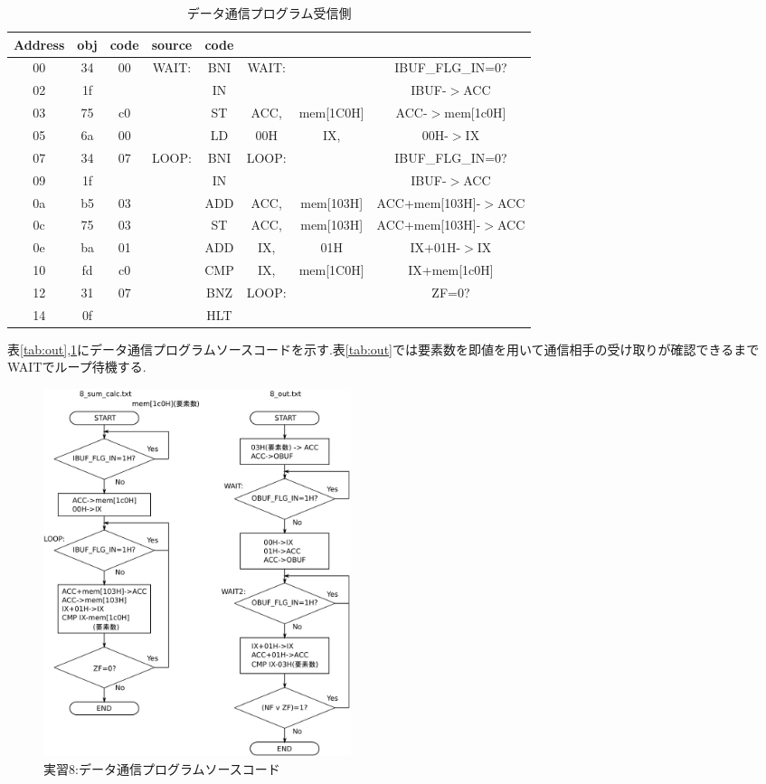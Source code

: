 \documentclass[dvipdfmx]{jsarticle}
\begin{document}
      \begin{table}[h]
        \centering
        \caption{データ通信プログラム受信側}
        \label{tab:in}
        \begin{tabular}{c|cc|cc|ccc}
          \hline \hline

          Address & obj & code & source  & code &  &  &  \\ \hline
          00 & 34 & 00 & WAIT: & BNI & WAIT: &  & IBUF_FLG_IN=0? \\
          02 & 1f &  &  & IN &  &  & IBUF-$>$ACC \\
          03 & 75 & c0 &  & ST & ACC, & mem[1C0H] & ACC-$>$mem[1c0H] \\
          05 & 6a & 00 &  & LD & 00H & IX, & 00H-$>$IX \\
          07 & 34 & 07 & LOOP: & BNI & LOOP: &  & IBUF\_FLG\_IN=0? \\
          09 & 1f &  &  & IN &  &  & IBUF-$>$ACC \\
          0a & b5 & 03 &  & ADD & ACC, & mem[103H] & ACC+mem[103H]-$>$ACC \\
          0c & 75 & 03 &  & ST & ACC, & mem[103H] & ACC+mem[103H]-$>$ACC \\
          0e & ba & 01 &  & ADD & IX, & 01H & IX+01H-$>$IX \\
          10 & fd & c0 &  & CMP & IX, & mem[1C0H] & IX+mem[1c0H] \\
          12 & 31 & 07 &  & BNZ & LOOP: &  & ZF=0? \\
          14 & 0f &  &  & HLT &  &  &  \\ \hline

        \end{tabular}
      \end{table}

表\ref{tab:out},\ref{tab:in}にデータ通信プログラムソースコードを示す.表\ref{tab:out}では要素数を即値を用いて通信相手の受け取りが確認できるまでWAITでループ待機する.

\begin{figure}[h]
  \centering
  \includegraphics[width=9cm]{8_in_out_flow.pdf}
  \caption{実習8:データ通信プログラムソースコード}
  \label{fig:8_in_out}
\end{figure}
\end{document}
